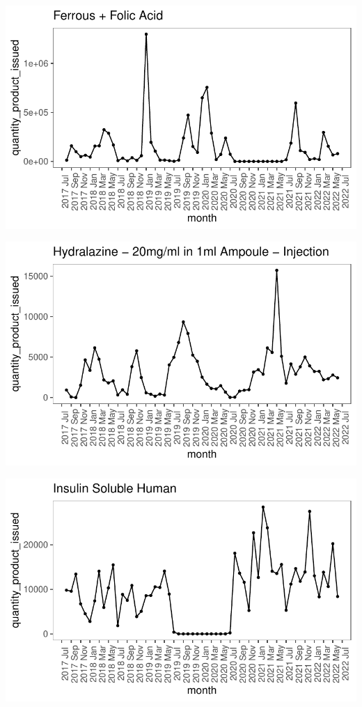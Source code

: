 \documentclass[
  authoryear,
  preprint,
  3p]{elsarticle}
\begin{document}
\includegraphics{main_files/figure-pdf/unnamed-chunk-16-1.pdf}

\includegraphics{main_files/figure-pdf/unnamed-chunk-17-1.pdf}

\includegraphics{main_files/figure-pdf/unnamed-chunk-18-1.pdf}
\end{document}
